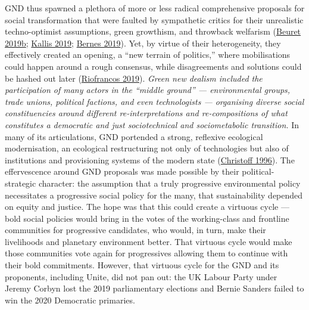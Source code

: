 \documentclass[a4paper, nobind]{templates/ociamthesis}
\begin{document}
GND thus spawned a plethora of more or less radical comprehensive proposals for social transformation that were faulted by sympathetic critics for their unrealistic techno-optimist assumptions, green growthism, and throwback welfarism (\protect\hyperlink{ref-beuret_green_2019}{Beuret 2019b}; \protect\hyperlink{ref-kallis_green_2019}{Kallis 2019}; \protect\hyperlink{ref-bernes_devil_2019}{Bernes 2019}). Yet, by virtue of their heterogeneity, they effectively created an opening, a ``new terrain of politics,'' where mobilisations could happen around a rough consensus, while disagreements and solutions could be hashed out later (\protect\hyperlink{ref-riofrancos_plan_2019}{Riofrancos 2019}). \emph{Green new dealism included the participation of many actors in the ``middle ground'' --- environmental groups, trade unions, political factions, and even technologists --- organising diverse social constituencies around different re-interpretations and re-compositions of what constitutes a democratic and just sociotechnical and sociometabolic transition.} In many of its articulations, GND portended a strong, reflexive ecological modernisation, an ecological restructuring not only of technologies but also of institutions and provisioning systems of the modern state (\protect\hyperlink{ref-christoff_ecological_1996}{Christoff 1996}). The effervescence around GND proposals was made possible by their political-strategic character: the assumption that a truly progressive environmental policy necessitates a progressive social policy for the many, that sustainability depended on equity and justice. The hope was that this could create a virtuous cycle --- bold social policies would bring in the votes of the working-class and frontline communities for progressive candidates, who would, in turn, make their livelihoods and planetary environment better. That virtuous cycle would make those communities vote again for progressives allowing them to continue with their bold commitments. However, that virtuous cycle for the GND and its proponents, including Unite, did not pan out: the UK Labour Party under Jeremy Corbyn lost the 2019 parliamentary elections and Bernie Sanders failed to win the 2020 Democratic primaries.
\end{document}
